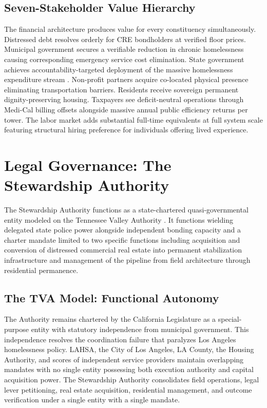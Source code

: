 \documentclass[12pt, letterpaper]{article}
\begin{document}
\subsection{Seven-Stakeholder Value Hierarchy}

The financial architecture produces value for every constituency simultaneously. Distressed debt resolves orderly for CRE bondholders at verified floor prices. Municipal government secures a verifiable reduction in chronic homelessness causing corresponding emergency service cost elimination. State government achieves accountability-targeted deployment of the massive homelessness expenditure stream \citep{ca_24b_expenditure_2024}. Non-profit partners acquire co-located physical presence eliminating transportation barriers. Residents receive sovereign permanent dignity-preserving housing. Taxpayers see deficit-neutral operations through Medi-Cal billing offsets alongside massive annual public efficiency returns per tower. The labor market adds substantial full-time equivalents at full system scale featuring structural hiring preference for individuals offering lived experience.

\section{Legal Governance: The Stewardship Authority}

The Stewardship Authority functions as a state-chartered quasi-governmental entity modeled on the Tennessee Valley Authority \citep{tva_act_1933}. It functions wielding delegated state police power alongside independent bonding capacity and a charter mandate limited to two specific functions including acquisition and conversion of distressed commercial real estate into permanent stabilization infrastructure and management of the pipeline from field architecture through residential permanence.

\subsection{The TVA Model: Functional Autonomy}

The Authority remains chartered by the California Legislature as a special-purpose entity with statutory independence from municipal government. This independence resolves the coordination failure that paralyzes Los Angeles homelessness policy. LAHSA, the City of Los Angeles, LA County, the Housing Authority, and scores of independent service providers maintain overlapping mandates with no single entity possessing both execution authority and capital acquisition power. The Stewardship Authority consolidates field operations, legal lever petitioning, real estate acquisition, residential management, and outcome verification under a single entity with a single mandate.
\end{document}
